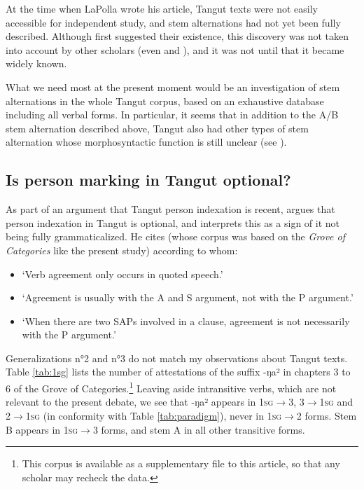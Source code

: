 \documentclass[oldfontcommands,oneside,a4paper,11pt]{article}
\newcommand{\ipa}[1]{{\phon \mbox{#1}}} %
\begin{document}
At the time when LaPolla wrote his article, Tangut texts were not easily accessible for independent study, and stem alternations had not yet been fully described. Although \citet{nishida75} first suggested their existence, this discovery was not taken into account by other scholars (even \citealt{kepping85} and \citealt{driem91tangut}), and it was not until \citet{gong01huying} that it became widely known.

 What we need most at the present moment would be an investigation of stem alternations in the whole Tangut corpus, based on an exhaustive database including all verbal forms. In particular, it seems that in addition to the A/B stem alternation described above, Tangut also had other types of stem alternation whose morphosyntactic function is still unclear (see \citealt{jacques14esquisse}).

\subsection{Is person marking in Tangut optional?} \label{sec:optional}
As part of an argument that Tangut person indexation is recent, 
\citet{lapolla92} argues that person indexation in Tangut is optional, and interprets this as a sign of it not being fully grammaticalized. He cites  \citet{ahrens90tangut} (whose corpus was based on the \textit{Grove of Categories} like the present study) according to whom:

\begin{itemize}
\item `Verb agreement only occurs in quoted speech.'
\item `Agreement is usually with the A and S argument, not with the P argument.'
\item `When there are two SAPs involved in a clause, agreement is not necessarily with the P argument.'
\end{itemize}

Generalizations n°2 and n°3 do not match my observations about Tangut texts. Table \ref{tab:1sg} lists the number of attestations of the suffix  \ipa{-ŋa²} in chapters 3 to 6 of the Grove of Categories.\footnote{This corpus is available as a supplementary file to this article, so that any scholar may recheck the data.} Leaving aside intransitive verbs, which are not relevant to the present debate, we see that \ipa{-ŋa²} appears in \textsc{1sg}$\rightarrow$3, 3$\rightarrow$\textsc{1sg} and 2$\rightarrow$\textsc{1sg} (in conformity with Table \ref{tab:paradigm}), never in \textsc{1sg}$\rightarrow$2 forms. Stem B appears  in \textsc{1sg}$\rightarrow$3 forms, and stem A in all other transitive forms. 
\end{document}
